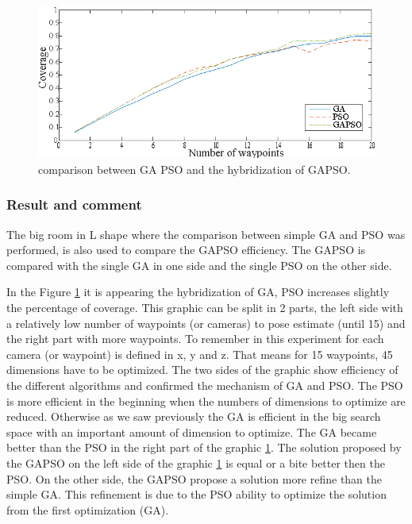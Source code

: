 \begin{figure}[t]
  \includegraphics[width=\linewidth]{img/GAPSO_GA_PSO3waypoint.eps}
  \caption{comparison between GA PSO and the hybridization of GAPSO.
}\label{fig:GAPSO}
  \endminipage\hfill
\end{figure}

 \subsubsection{Result and comment }
  

The big room in L shape where the comparison between simple GA and PSO was performed, is also used to compare the GAPSO efficiency. The GAPSO is compared with the single GA in one side and the single PSO on the other side. 

In the Figure \ref{fig:GAPSO} it is appearing the hybridization of GA, PSO increases slightly the percentage of coverage.%
This graphic can be split in 2 parts, the left side with a relatively low number of waypoints (or cameras) to pose estimate (until 15) and the right part with more waypoints. To remember in this experiment for each camera (or waypoint) is defined in x, y and z. That means for 15 waypoints, 45 dimensions have to be optimized.
The two sides of the graphic show efficiency of the different algorithms and confirmed the mechanism of GA and PSO.
The PSO is more efficient in the beginning when the numbers of dimensions to optimize are reduced. Otherwise as we saw previously the GA is efficient in the big search space with an important amount of dimension to optimize. The GA became better than the PSO in the right part of the graphic \ref{fig:GAPSO}. 
The solution  proposed by the GAPSO on the left side of the graphic \ref{fig:GAPSO} is equal or a bite better then the PSO. On the other side, the GAPSO propose a solution more refine than the simple GA. This refinement is due to the PSO ability to optimize the solution from the first optimization (GA). 

